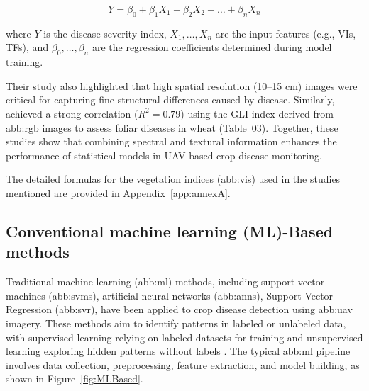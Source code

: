 \begin{equation}
Y = \beta_0 + \beta_1X_1 + \beta_2X_2 + \ldots + \beta_nX_n
\label{eq:plsr}
\end{equation}

where $Y$ is the disease severity index, $X_1, \ldots, X_n$ are the input features (e.g., VIs, TFs), and $\beta_0, \ldots, \beta_n$ are the regression coefficients determined during model training.

Their study also highlighted that high spatial resolution (10–15 cm) images were critical for capturing fine structural differences caused by disease. Similarly, \parencite{bhandari2020assessing} achieved a strong correlation ($R^2 = 0.79$) using the GLI index derived from \gls{abb:rgb} images to assess foliar diseases in wheat (Table~03). Together, these studies show that combining spectral and textural information enhances the performance of statistical models in UAV-based crop disease monitoring.

The detailed formulas for the vegetation indices (\gls{abb:vi}s) used in the studies mentioned are provided in Appendix~\ref{app:annexA}.
\begin{table}[htbp]
    \caption{Summary of ST-based methods for Wheat disease estimation using \gls{abb:uav} imagery.}
    \centering
    \label{tab:summary}
\end{table}



\subsection{Conventional machine learning (ML)-Based methods}
Traditional machine learning (\gls{abb:ml}) methods, including support vector machines (\gls{abb:svm}s), artificial neural networks (\gls{abb:ann}s), Support Vector Regression (\gls{abb:svr}), have been applied to crop disease detection using \gls{abb:uav} imagery. These methods aim to identify patterns in labeled or unlabeled data, with supervised learning relying on labeled datasets for training and unsupervised learning exploring hidden patterns without labels \parencite{shahi2023recent}. The typical \gls{abb:ml} pipeline involves data collection, preprocessing, feature extraction, and model building, as shown in Figure~\ref{fig:MLBased}.


